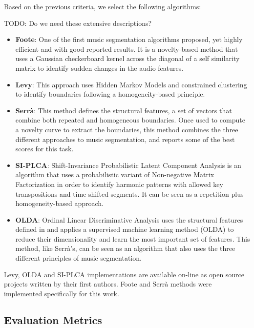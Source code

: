 \documentclass{article}
\begin{document}
Based on the previous criteria, we select the following algorithms:

TODO: Do we need these extensive descriptions?

\begin{itemize}
  \item
    \textbf{Foote}: One of the first music segmentation algorithms proposed, yet highly efficient and with good reported results\cite{Foote1999}. It is a novelty-based method that uses a Gaussian checkerboard kernel across the diagonal of a self similarity matrix to identify sudden changes in the audio features.
  \item
    \textbf{Levy}: This approach uses Hidden Markov Models and constrained clustering to identify boundaries following a homogeneity-based principle\cite{Levy2008}.
  \item
    \textbf{Serr\`a}: This method defines the structural features, a set of vectors that combine both repeated and homogeneous boundaries. Once used to compute a novelty curve to extract the boundaries, this method combines the three different approaches to music segmentation, and reports some of the best scores for this task\cite{Serra2013}.
  \item
    \textbf{SI-PLCA}: Shift-Invariance Probabilistic Latent Component Analysis is an algorithm that uses a probabilistic variant of Non-negative Matrix Factorization in order to identify harmonic patterns with allowed key transpositions and time-shifted segments\cite{Weiss2011}. It can be seen as a repetition plus homogeneity-based approach.
  \item 
    \textbf{OLDA}: Ordinal Linear Discriminative Analysis uses the structural features defined in \cite{Serra2013} and applies a supervised machine learning method (OLDA) to reduce their dimensionality and learn the most important set of features\cite{McFee2014}. This method, like Serr\`a's, can be seen as an algorithm that also uses the three different principles of music segmentation.
\end{itemize}

Levy, OLDA and SI-PLCA implementations are available on-line as open source projects written by their first authors.
Foote and Serr\`a methods were implemented specifically for this work.

\subsection{Evaluation Metrics}\label{subsec:hitrate}
\end{document}
